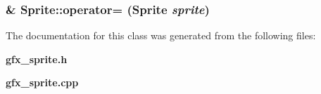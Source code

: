 \subsubsection{ \& Sprite::operator= ({\bf Sprite} {\em sprite})}\label{classEngine_1_1Sprite_4f5cc89502003ffe4dd2796518bed41a}




The documentation for this class was generated from the following files:\begin{CompactItemize}
\item 
{\bf gfx\_\-sprite.h}\item 
{\bf gfx\_\-sprite.cpp}\end{CompactItemize}

